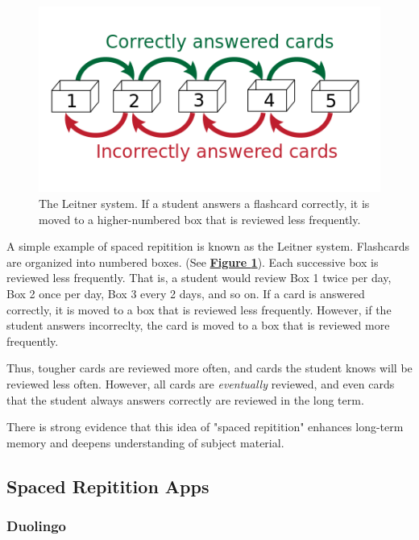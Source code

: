 \begin{figure}[h]
	\includegraphics[width=1.0\linewidth]{figures/leitner}
	\caption{The Leitner system. If a student answers a flashcard correctly, it is moved to a higher-numbered box that is reviewed less frequently.}
	\label{fig:leitner}
\end{figure}

\par A simple example of spaced repitition is known as the Leitner system. Flashcards are organized into numbered boxes. (See \textbf{\hyperref[fig:leitner]{Figure \ref*{fig:leitner}}}). Each successive box is reviewed less frequently. That is, a student would review Box 1 twice per day, Box 2 once per day, Box 3 every 2 days, and so on. If a card is answered correctly, it is moved to a box that is reviewed less frequently. However, if the student answers incorreclty, the card is moved to a box that is reviewed more frequently.

\par Thus, tougher cards are reviewed more often, and cards the student knows will be reviewed less often. However, all cards are \textit{eventually} reviewed, and even cards that the student always answers correctly are reviewed in the long term.

\par There is strong evidence that this idea of "spaced repitition" enhances long-term memory and deepens understanding of subject material. \cite{edge2012memreflex}


 \subsection{Spaced Repitition Apps}
 \subsubsection{Duolingo}
 
